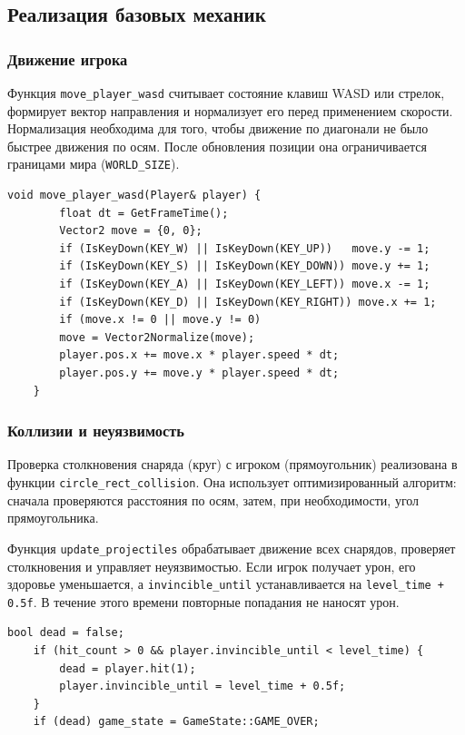 \documentclass[../main.tex]{subfiles}
\begin{document}
\subsection{Реализация базовых механик}

\subsubsection{Движение игрока}

Функция \texttt{move\_player\_wasd} считывает состояние клавиш WASD или стрелок, формирует вектор направления и нормализует его перед применением скорости. Нормализация необходима для того, чтобы движение по диагонали не было быстрее движения по осям. После обновления позиции она ограничивается границами мира (\texttt{WORLD\_SIZE}).

\begin{lstlisting}[caption={move\_player\_wasd (упрощённо)}]
	void move_player_wasd(Player& player) {
		float dt = GetFrameTime();
		Vector2 move = {0, 0};
		if (IsKeyDown(KEY_W) || IsKeyDown(KEY_UP))   move.y -= 1;
		if (IsKeyDown(KEY_S) || IsKeyDown(KEY_DOWN)) move.y += 1;
		if (IsKeyDown(KEY_A) || IsKeyDown(KEY_LEFT)) move.x -= 1;
		if (IsKeyDown(KEY_D) || IsKeyDown(KEY_RIGHT)) move.x += 1;
		if (move.x != 0 || move.y != 0)
		move = Vector2Normalize(move);
		player.pos.x += move.x * player.speed * dt;
		player.pos.y += move.y * player.speed * dt;
	}
\end{lstlisting}

\subsubsection{Коллизии и неуязвимость}

Проверка столкновения снаряда (круг) с игроком (прямоугольник) реализована в функции \texttt{circle\_rect\_collision}. Она использует оптимизированный алгоритм: сначала проверяются расстояния по осям, затем, при необходимости, угол прямоугольника.

Функция \texttt{update\_projectiles} обрабатывает движение всех снарядов, проверяет столкновения и управляет неуязвимостью. Если игрок получает урон, его здоровье уменьшается, а \texttt{invincible\_until} устанавливается на \texttt{level\_time + 0.5f}. В течение этого времени повторные попадания не наносят урон.

\begin{lstlisting}[caption={Фрагмент update\_projectiles}]
	bool dead = false;
	if (hit_count > 0 && player.invincible_until < level_time) {
		dead = player.hit(1);
		player.invincible_until = level_time + 0.5f;
	}
	if (dead) game_state = GameState::GAME_OVER;
\end{lstlisting}
\end{document}
